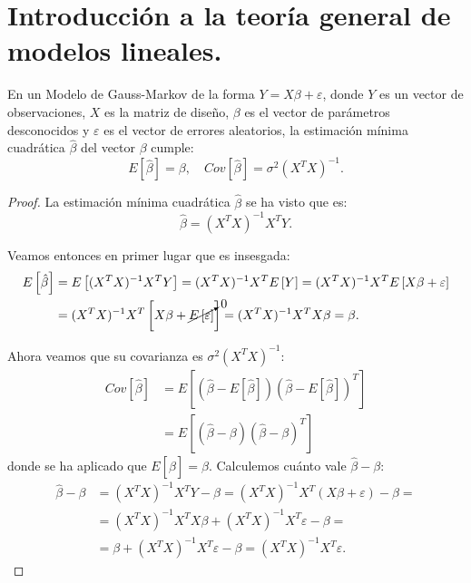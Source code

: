 \section{Introducción a la teoría general de modelos lineales.}

\begin{prop}
    En un Modelo de Gauss-Markov de la forma $Y= X\beta + \varepsilon$, donde $Y$ es un vector de observaciones, $X$ es la matriz de diseño, $\beta$ es el vector de parámetros desconocidos y $\varepsilon$ es el vector de errores aleatorios, la estimación mínima cuadrática $\hat{\beta}$ del vector $\beta$ cumple:
    \begin{equation*}
        E\left[\hat{\beta}\right] = \beta, \quad Cov\left[\hat{\beta}\right] = \sigma^2 (X^TX)^{-1}.
    \end{equation*}
    \begin{proof}
        La estimación mínima cuadrática $\hat{\beta}$ se ha visto que es:
        \begin{equation*}
            \hat{\beta} = (X^TX)^{-1}X^TY.
        \end{equation*}

        Veamos entonces en primer lugar que es insesgada:
        \begin{align*}
            E\left[\hat{\beta}\right] &= E\left[(X^TX)^{-1}X^TY\right] = (X^TX)^{-1}X^TE\left[Y\right] 
            = (X^TX)^{-1}X^TE\left[X\beta + \varepsilon\right] \\
            &= (X^TX)^{-1}X^T\left[X\beta + \cancelto{0}{E\left[\varepsilon\right]}\right] = (X^TX)^{-1}X^TX\beta = \beta.
        \end{align*}

        Ahora veamos que su covarianza es $\sigma^2 (X^TX)^{-1}$:
        \begin{align*}
            Cov\left[\hat{\beta}\right] &= E\left[\left(\hat{\beta} - E\left[\hat{\beta}\right]\right)\left(\hat{\beta} - E\left[\hat{\beta}\right]\right)^T\right] \\
            &= E\left[\left(\hat{\beta} - \beta\right)\left(\hat{\beta} - \beta\right)^T\right]
        \end{align*}
        donde se ha aplicado que $E\left[\hat{\beta}\right] = \beta$. Calculemos cuánto vale $\hat{\beta} - \beta$:
        \begin{align*}
            \hat{\beta} - \beta &= (X^TX)^{-1}X^TY - \beta = (X^TX)^{-1}X^T\left(X\beta + \varepsilon\right) - \beta =\\&= (X^TX)^{-1}X^TX\beta + (X^TX)^{-1}X^T\varepsilon - \beta =\\
            &= \beta + (X^TX)^{-1}X^T\varepsilon - \beta = (X^TX)^{-1}X^T\varepsilon.
        \end{align*}


\end{proof}
\end{prop}
